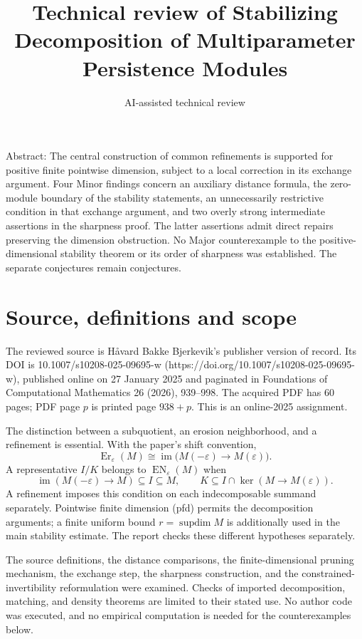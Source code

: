 \documentclass[10pt]{article}
\title{Technical review of
Stabilizing Decomposition of Multiparameter Persistence Modules}
\author{AI-assisted technical review}
\date{}
\begin{document}
\maketitle
Abstract: The central construction of common refinements is supported for positive finite pointwise dimension, subject to a local correction in its exchange argument. Four Minor findings concern an auxiliary distance formula, the zero-module boundary of the stability statements, an unnecessarily restrictive condition in that exchange argument, and two overly strong intermediate assertions in the sharpness proof. The latter assertions admit direct repairs preserving the dimension obstruction. No Major counterexample to the positive-dimensional stability theorem or its order of sharpness was established. The separate conjectures remain conjectures.\par
\section*{Source, definitions and scope}
The reviewed source is Håvard Bakke Bjerkevik’s publisher version of record. Its DOI is 10.1007/s10208-025-09695-w (https://doi.org/10.1007/s10208-025-09695-w), published online on 27 January 2025 and paginated in Foundations of Computational Mathematics 26 (2026), 939–998. The acquired PDF has 60 pages; PDF page \(p\) is printed page \(938+p\). This is an online-2025 assignment.\par
The distinction between a subquotient, an erosion neighborhood, and a refinement is essential. With the paper’s shift convention, \[\operatorname{Er}_\varepsilon(M)\cong
 \operatorname{im}\bigl(M(-\varepsilon)\longrightarrow M(\varepsilon)\bigr).\] A representative \(I/K\) belongs to \(\operatorname{EN}_\varepsilon(M)\) when \[\operatorname{im}(M(-\varepsilon)\to M)\subseteq I\subseteq M,
 \qquad K\subseteq I\cap\ker(M\to M(\varepsilon)).\] A refinement imposes this condition on each indecomposable summand separately. Pointwise finite dimension (pfd) permits the decomposition arguments; a finite uniform bound \(r=\operatorname{supdim}M\) is additionally used in the main stability estimate. The report checks these different hypotheses separately.\par
The source definitions, the distance comparisons, the finite-dimensional pruning mechanism, the exchange step, the sharpness construction, and the constrained-invertibility reformulation were examined. Checks of imported decomposition, matching, and density theorems are limited to their stated use. No author code was executed, and no empirical computation is needed for the counterexamples below.\par
\end{document}

